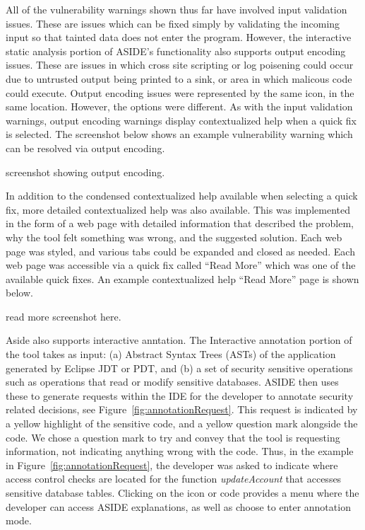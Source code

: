 \documentclass[twoside,letterpaper]{soups}
\begin{document}
All of the vulnerability warnings shown thus far have involved input validation issues. These are issues which can be fixed simply by validating the incoming input so that tainted data does not enter the program. However, the interactive static analysis portion of ASIDE's functionality also supports output encoding issues. These are issues in which cross site scripting or log poisening could occur due to untrusted output being printed to a sink, or area in which malicous code could execute. Output encoding issues were represented by the same icon, in the same location. However, the options were different. As with the input validation warnings, output encoding warnings display contextualized help when a quick fix is selected. The screenshot below shows an example vulnerability warning which can be resolved via output encoding.

screenshot showing output encoding.


In addition to the condensed contextualized help available when selecting a quick fix, more detailed contextualized help was also available. This was implemented in the form of a web page with detailed information that described the problem, why the tool felt something was wrong, and the suggested solution. Each web page was styled, and various tabs could be expanded and closed as needed. Each web page was accessible via a quick fix called ``Read More'' which was one of the available quick fixes. An example contextualized help ``Read More'' page is shown below.

read more screenshot here.



Aside also supports interactive anntation. The Interactive annotation portion of the tool takes as input: (a) Abstract Syntax Trees (ASTs) of the application generated by Eclipse JDT or PDT, and (b) a set of security sensitive operations such as operations that read or modify sensitive databases. ASIDE then uses these to generate requests within the IDE for the developer to annotate security related decisions, see Figure~\ref{fig:annotationRequest}. This request is indicated by a yellow highlight of the sensitive code, and a yellow question mark alongside the code. We chose a question mark to try and convey that the tool is requesting information, not indicating anything wrong with the code. Thus, in the example in Figure~\ref{fig:annotationRequest}, the developer was asked to indicate where access control checks are located for the function \textit{updateAccount} that accesses sensitive database tables. Clicking on the icon or code provides a menu where the developer can access ASIDE explanations, as well as choose to enter annotation mode. 
\end{document}

